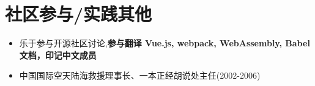 \documentclass{resume_withphoto}
\begin{document}
\section{社区参与/实践其他}
\begin{itemize}[parsep=0.2ex]
  \item 乐于参与开源社区讨论,\textbf{参与翻译 Vue.js, webpack, WebAssembly, Babel 文档，印记中文成员}
  \item 中国国际空天陆海救援理事长、一本正经胡说处主任(2002-2006)
\end{itemize}

%
%
\end{document}

